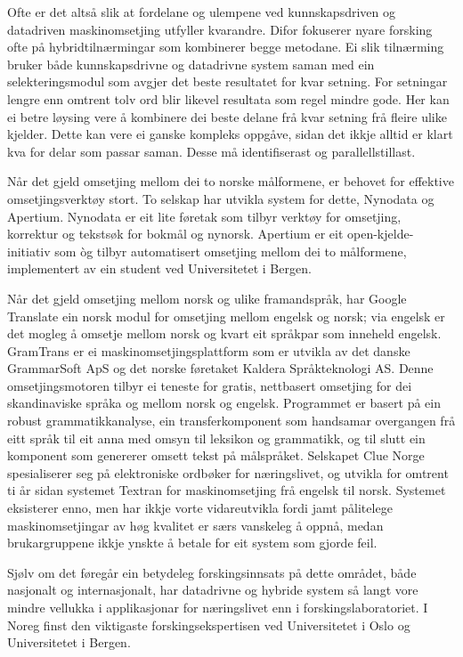 \begin{multicols}{2}
Ofte er det altså slik at fordelane og ulempene ved kunnskapsdriven og datadriven maskinomsetjing utfyller kvarandre. Difor fokuserer nyare forsking ofte på hybridtilnærmingar som kombinerer begge metodane. Ei slik tilnærming bruker både kunnskapsdrivne og datadrivne system saman med ein selekteringsmodul som avgjer det beste resultatet for kvar setning. For setningar lengre enn omtrent tolv ord blir likevel resultata som regel mindre gode. Her kan ei betre løysing vere å kombinere dei beste delane frå kvar setning frå fleire ulike kjelder. Dette kan vere ei ganske kompleks oppgåve, sidan det ikkje alltid er klart kva for delar som passar saman. Desse må identifiserast og parallellstillast.   


Når det gjeld omsetjing mellom dei to norske målformene, er behovet for effektive omsetjingsverktøy stort. To selskap har utvikla system for dette, Nynodata og Apertium. Nynodata er eit lite føretak som tilbyr verktøy for omsetjing, korrektur og tekstsøk for bokmål og nynorsk. Apertium er eit open-kjelde-initiativ som òg tilbyr automatisert omsetjing mellom dei to målformene, implementert av ein student ved Universitetet i Bergen.

Når det gjeld omsetjing mellom norsk og ulike framandspråk, har Google Translate ein norsk modul for omsetjing mellom engelsk og norsk; via engelsk er det mogleg å omsetje mellom norsk og kvart eit språkpar som inneheld engelsk. GramTrans er ei maskinomsetjingsplattform som er utvikla av det danske GrammarSoft ApS og det norske føretaket Kaldera Språkteknologi AS. Denne omsetjingsmotoren tilbyr ei teneste for gratis, nettbasert omsetjing for dei skandinaviske språka og mellom norsk og engelsk. Programmet er basert på ein robust grammatikkanalyse, ein transferkomponent som handsamar overgangen frå eitt språk til eit anna med omsyn til leksikon og grammatikk, og til slutt ein komponent som genererer omsett tekst på målspråket. Selskapet Clue Norge spesialiserer seg på elektroniske ordbøker for næringslivet, og utvikla for omtrent ti år sidan systemet Textran for maskinomsetjing frå engelsk til norsk. Systemet eksisterer enno, men har ikkje vorte vidareutvikla fordi jamt pålitelege maskinomsetjingar av høg kvalitet er særs vanskeleg å oppnå, medan brukargruppene ikkje ynskte å betale for eit system som gjorde feil.

Sjølv om det føregår ein betydeleg forskingsinnsats på dette området, både nasjonalt og internasjonalt, har datadrivne og hybride system så langt vore mindre vellukka i applikasjonar for næringslivet enn i forskingslaboratoriet. I Noreg finst den viktigaste forskingsekspertisen ved Universitetet i Oslo og Universitetet i Bergen.


\end{multicols}
